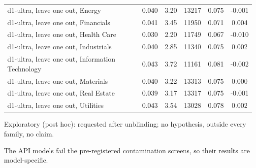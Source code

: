 \begin{longtable}{@{}lS[table-format=-1.3]S[table-format=-1.2]S[table-format=5.0]S[table-format=-1.3]S[table-format=-1.3]@{}}
d1-ultra, leave one out, Energy & 0.040 & 3.20 & 13217 & 0.075 & -0.001 \\
d1-ultra, leave one out, Financials & 0.041 & 3.45 & 11950 & 0.071 & 0.004 \\
d1-ultra, leave one out, Health Care & 0.030 & 2.20 & 11749 & 0.067 & -0.010 \\
d1-ultra, leave one out, Industrials & 0.040 & 2.85 & 11340 & 0.075 & 0.002 \\
d1-ultra, leave one out, Information Technology & 0.043 & 3.72 & 11161 & 0.081 & -0.002 \\
d1-ultra, leave one out, Materials & 0.040 & 3.22 & 13313 & 0.075 & 0.000 \\
d1-ultra, leave one out, Real Estate & 0.039 & 3.17 & 13317 & 0.075 & -0.001 \\
d1-ultra, leave one out, Utilities & 0.043 & 3.54 & 13028 & 0.078 & 0.002 \\
\end{longtable}
\endgroup
\vspace{-0.5\baselineskip}
{\footnotesize\raggedright
Exploratory (post hoc): requested after unblinding; no hypothesis, outside every family, no claim.\par
The API models fail the pre-registered contamination screens, so their results are model-specific.\par
}
